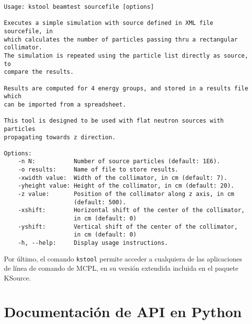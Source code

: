 \begin{lstlisting}[label={lst:beamtest}, caption=Instrucciones de uso del comando \texttt{kstool beamtest} (output de ``\texttt{kstool beamtest --help}'').]
Usage: kstool beamtest sourcefile [options]

Executes a simple simulation with source defined in XML file sourcefile, in
which calculates the number of particles passing thru a rectangular collimator.
The simulation is repeated using the particle list directly as source, to
compare the results.

Results are computed for 4 energy groups, and stored in a results file which
can be imported from a spreadsheet.

This tool is designed to be used with flat neutron sources with particles
propagating towards z direction.

Options:
	-n N:           Number of source particles (default: 1E6).
	-o results:     Name of file to store results.
	-xwidth value:  Width of the collimator, in cm (default: 7).
	-yheight value: Height of the collimator, in cm (default: 20).
	-z value:       Position of the collimator along z axis, in cm
	                (default: 500).
	-xshift:        Horizontal shift of the center of the collimator,
	                in cm (default: 0)
	-yshift:        Vertical shift of the center of the collimator,
	                in cm (default: 0)
	-h, --help:     Display usage instructions.
\end{lstlisting}

Por último, el comando \verb|kstool| permite acceder a cualquiera de las aplicaciones de línea de comando de MCPL, en su versión extendida incluida en el paquete KSource.



\section{Documentación de API en Python}
\label{ap:Python}

